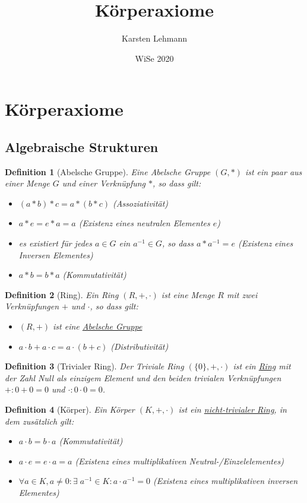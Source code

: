 \documentclass{article}
\author{Karsten Lehmann}
\date{WiSe 2020}
\title{Körperaxiome}
\newtheorem*{definition}{Definition}
\begin{document}
\section*{Körperaxiome}

\subsection*{Algebraische Strukturen}

\begin{definition}[Abelsche Gruppe]
  \label{def:abel}
  Eine Abelsche Gruppe $(G, *)$ ist ein paar aus einer Menge $G$ und einer Verknüpfung $*$, so dass gilt:
  \begin{itemize}
  \item $(a * b) * c = a * (b * c)$ (Assoziativität)
  \item $a * e = e * a = a$ (Existenz eines neutralen Elementes $e$)
  \item es existiert für jedes $a \in G$ ein $a^{-1} \in G$, so dass $a * a^{-1} = e$
    (Existenz eines Inversen Elementes)
  \item $a * b = b * a$ (Kommutativität)
  \end{itemize}
\end{definition}

\begin{definition}[Ring]
  \label{def:ring}
  Ein Ring $(R, +, \cdot)$ ist eine Menge $R$ mit zwei Verknüpfungen $+$ und $\cdot$, so dass gilt:
  \begin{itemize}
  \item $(R, +)$ ist eine \hyperref[def:abel]{Abelsche Gruppe}
  \item $a \cdot b + a \cdot c = a \cdot (b + c)$ (Distributivität)
  \end{itemize}
\end{definition}

\begin{definition}[Trivialer Ring]
  \label{def:trivring}
  Der Triviale Ring $(\{ 0 \}, +, \cdot)$ ist ein \hyperref[def:ring]{Ring} mit der Zahl Null als
  einzigem Element und den beiden trivialen Verknüpfungen $+ \colon 0 + 0 = 0$ und
  $\cdot \colon 0 \cdot 0 = 0$.
\end{definition}

\begin{definition}[Körper]
  Ein Körper $(K, +, \cdot)$ ist ein \hyperref[def:trivring]{nicht-trivialer Ring}, in dem zusätzlich gilt:
  \begin{itemize}
  \item $a \cdot b = b \cdot a$ (Kommutativität)
  \item $a \cdot e = e \cdot a = a$ (Existenz eines multiplikativen Neutral-/Einzelelementes)
  \item $\forall a \in K, a \ne 0 \colon \exists \; a^{-1} \in K \colon a \cdot a^{-1} = 0$
    (Existenz eines multiplikativen inversen Elementes)
  \end{itemize}
\end{definition}
\end{document}
